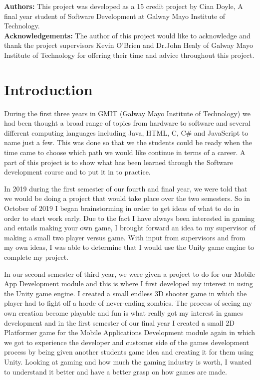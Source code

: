 \textbf {Authors:} This project was developed as a 15 credit project by Cian Doyle, A final year student of Software Development at Galway Mayo Institute of Technology.\\

\textbf {Acknowledgements:} The author of this project would like to acknowledge and thank the project supervisors Kevin O'Brien and Dr.John Healy of Galway Mayo Institute of Technology for offering their time and advice throughout this project.
\newpage


\chapter{Introduction}
 During the first three years in GMIT (Galway Mayo Institute of Technology) we had been thought a broad range of topics from hardware to software and several different computing languages including Java, HTML, C, C\# and JavaScript to name just a few. This was done so that we the students could be ready when the time came to choose which path we would like continue in terms of a career. A part of this project is to show what has been learned through the Software development course and to put it in to practice.\par

In 2019 during the first semester of our fourth and final year, we were told that we would be doing a project that would take place over the two semesters. So in October of 2019 I began brainstorming in order to get ideas of what to do in order to start work early. Due to the fact I have always been interested in gaming and entails making your own game, I brought forward an idea to my supervisor of making a small two player versus game. With input from supervisors and from my own ideas, I was able to determine that I would use the Unity game engine to complete my project.\par
In our second semester of third year, we were given a project to do for our Mobile App Development module and this is where I first developed my interest in using the Unity game engine. I created a small endless 3D shooter game in which the player had to fight off a horde of never-ending zombies. The process of seeing my own creation become playable and fun is what really got my interest in games development and in the first semester of our final year I created a small 2D Platformer game for the Mobile Applications Development module again in which we got to experience the developer and customer side of the games development process by being given another students game idea and creating it for them using Unity. Looking at gaming and how much the gaming industry is worth, I wanted to understand it better and have a better grasp on how games are made.

